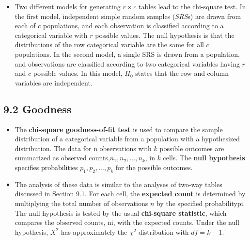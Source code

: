 \begin{itemize}
			\item Two different models for generating $r\times c$ tables lead to the chi-square test. In the first model, independent simple random samples (\textit{SRS}s) are drawn from each of $c$ populations, and each observation is classified according to a categorical variable with $r$ possible values. The null hypothesis is that the distributions of the row categorical variable are the same for all $c$ populations. In the second model, a single SRS is drawn from a population, and observations are classified according to two categorical variables having $r$ and $c$ possible values. In this model, $H_0$ states that the row and column variables are independent.
		\end{itemize}
	\subsection{9.2 Goodness}
		\begin{itemize}
			\item The \textbf{chi-square goodness-of-fit test} is used to compare the sample distribution of a categorical variable from a population with a hypothesized distribution. The data for n observations with $k$ possible outcomes are summarized as observed counts,$ n_1, n_2,..., n_k$, in $k$ cells. The \textbf{null hypothesis} specifies probabilities $p_1, p_2,..., p_k$ for the possible outcomes.
			
			\item The analysis of these data is similar to the analyses of two-way tables discussed in Section 9.1. For each cell, the \textbf{expected count} is determined by multiplying the total number of observations $n$ by the specified probabilitypi. The null hypothesis is tested by the usual \textbf{chi-square statistic}, which compares the observed counts, ni, with the expected counts. Under the null hypothesis, $X^2$ has approximately the $\chi^2$ distribution with $df=k-1$.
		\end{itemize}